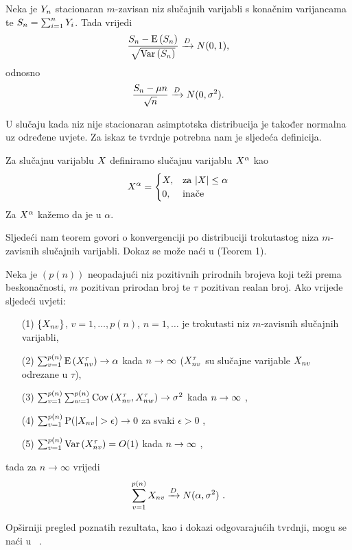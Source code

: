 \begin{tm}
	\label{tm:mzavisanstacionarnicgt}
	Neka je $\tsvar{Y}_n$ stacionaran $m$-zavisan niz slučajnih varijabli
	s konačnim varijancama te $\tsvar{S}_n = \sum_{i=1}^{n} \tsvar{Y}_i$.
	Tada vrijedi
	\begin{equation}
		\konvpd{
			\frac{\tsvar{S}_n - \vE{\tsvar{S}_n}}{\sqrt{\vVar{\tsvar{S}_n}}}
		}{
			N(0,1),
		}
	\end{equation}
	odnosno
	\begin{equation}
		\konvpd{
			\frac{\tsvar{S}_n - \mu n}{\sqrt{n}}
		}{
			N(0,\sigma^2).
		}
	\end{equation}
\end{tm}
%
U slučaju kada niz nije stacionaran asimptotska distribucija
je također normalna uz određene uvjete. Za iskaz te
tvrdnje potrebna nam je sljedeća definicija.

\begin{defn}
	Za slučajnu varijablu $\tsvar{X}$ definiramo 
	slučajnu varijablu $\tsvar{X}^{\alpha}$ kao
	\[
		\tsvar{X}^{\alpha} =
		\begin{cases}
			X, & \text{za } |X| \leq \alpha \\
			0, & \text{inače}
		\end{cases}
	\]
	Za $\tsvar{X}^{\alpha}$ kažemo da je 
	 u $\alpha$.
\end{defn}


Sljedeći nam teorem govori o konvergenciji po distribuciji
trokutastog niza $m$-zavisnih slučajnih varijabli. Dokaz se može
naći u \textcite{orey_central_1958}(Teorem 1).

\begin{tm}[Orey] 
\label{Thm_Orey_1958}
Neka je $(p(n))$ neopadajući niz pozitivnih prirodnih brojeva
koji teži prema beskonačnosti, $m$ pozitivan prirodan broj
te $\tau$ pozitivan realan broj. Ako vrijede sljedeći
uvjeti:
\begin{itemize}
	\item[(1)]{ $\{\tsvar{X}_{nv}\}$,
		$v=1,\ldots,p(n)$, $n=1,\ldots$ je trokutasti
		niz $m$-zavisnih slučajnih varijabli, }
	\item[(2)]{ $\sum_{v=1}^{p(n)} \vE{\tsvar{X}_{nv}^{\tau}} \rightarrow \alpha$ kada 
		$n \rightarrow \infty$ ($\tsvar{X}_{nv}^{\tau}$ su slučajne varijable
		$\tsvar{X}_{nv}$ odrezane u $\tau$),}
	\item[(3)]{ $\sum_{v=1}^{p(n)} \sum_{w=1}^{p(n)} 
		\vCov{\tsvar{X}_{nv}^{\tau}, \tsvar{X}_{nw}^{\tau}} \rightarrow \sigma^2$ kada
		$n \rightarrow \infty$ ,}
	\item[(4)]{ $\sum_{v=1}^{p(n)} 
		\vP(|\tsvar{X}_{nv}| > \epsilon ) \rightarrow 0$  za svaki $\epsilon > 0$ ,}
	\item[(5)]{ $\sum_{v=1}^{p(n)} \vVar{\tsvar{X}_{nv}^{\tau}} = O(1)$ kada
		$n \rightarrow \infty$ ,}
\end{itemize}
tada za $n\to\infty$ vrijedi
\[ 
	\konvpd{ \sum_{v=1}^{p(n)} \tsvar{X}_{nv} }{  N(\alpha,\sigma^2) } \ .
\]
\end{tm}

Opširniji pregled poznatih rezultata,
kao i dokazi odgovarajućih tvrdnji, mogu
se naći u ~\textcite{ferguson_course_1996}.
